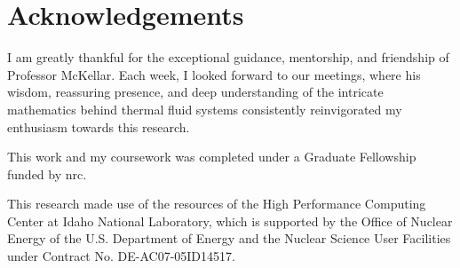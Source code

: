    \chapter{Acknowledgements}
   I am greatly thankful for the exceptional guidance, mentorship, and friendship of Professor McKellar. Each week, I looked forward to our meetings, where his wisdom, reassuring presence, and deep understanding of the intricate mathematics behind thermal fluid systems consistently reinvigorated my enthusiasm towards this research. 

   This work and my coursework was completed under a Graduate Fellowship funded by \acf{nrc}.
   
   This research made use of the resources of the High Performance Computing Center at Idaho National Laboratory, which is supported by the Office of Nuclear Energy of the U.S. Department of Energy and the Nuclear Science User Facilities under Contract No. DE-AC07-05ID14517.

